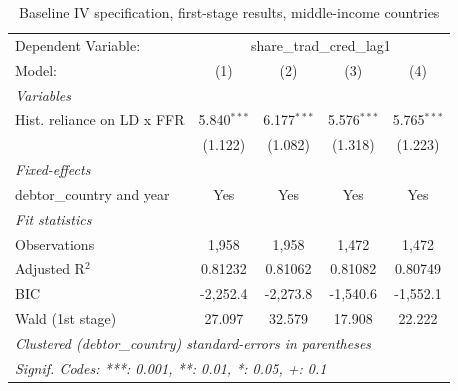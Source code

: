 
\begin{table}[htbp]
   \caption{\label{tab:results_baseline_iv_overall_1st-stage_other} Baseline IV specification, first-stage results, middle-income countries}
   \centering
   \begin{tabular}{lcccc}
      \tabularnewline \midrule \midrule
      Dependent Variable: & \multicolumn{4}{c}{share\_trad\_cred\_lag1}\\
      Model:                     & (1)           & (2)           & (3)           & (4)\\  
      \midrule
      \emph{Variables}\\
      Hist. reliance on LD x FFR & 5.840$^{***}$ & 6.177$^{***}$ & 5.576$^{***}$ & 5.765$^{***}$\\   
                                 & (1.122)       & (1.082)       & (1.318)       & (1.223)\\   
      \midrule
      \emph{Fixed-effects}\\
      debtor\_country and year   & Yes           & Yes           & Yes           & Yes\\  
      \midrule
      \emph{Fit statistics}\\
      Observations               & 1,958         & 1,958         & 1,472         & 1,472\\  
      Adjusted R$^2$             & 0.81232       & 0.81062       & 0.81082       & 0.80749\\  
      BIC                        & -2,252.4      & -2,273.8      & -1,540.6      & -1,552.1\\  
      Wald (1st stage)           & 27.097        & 32.579        & 17.908        & 22.222\\  
      \midrule \midrule
      \multicolumn{5}{l}{\emph{Clustered (debtor\_country) standard-errors in parentheses}}\\
      \multicolumn{5}{l}{\emph{Signif. Codes: ***: 0.001, **: 0.01, *: 0.05, +: 0.1}}\\
   \end{tabular}
\end{table}


